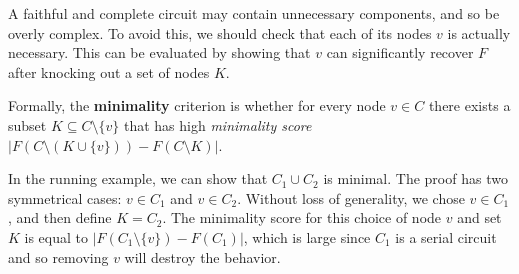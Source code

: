 A faithful and complete circuit may contain unnecessary components, and so be overly complex. %
To avoid this, we should check that each of its nodes $v$ is actually necessary. %
This can be evaluated by showing that $v$ can significantly recover $F$ after knocking out a set of nodes $K$. 

Formally, the \textbf{minimality} criterion is whether for every node $v\in C$ there exists a subset $K \subseteq C \setminus \{v\}$ that has high \emph{minimality score} $|F(C \setminus (K \cup \{ v \})) - F(C \setminus K)| $. %




In the running example, we can show that $C_1 \cup C_2$ is minimal. The proof has two symmetrical cases: $v \in C_1 $ and $v\in C_2$. Without loss of generality, we chose $v \in C_1$, and then define $K = C_2$. The minimality score for this choice of node $v$ and set $K$ is equal to $|F(C_1 \setminus \{ v\}) - F(C_1)|$, which is large since $C_1$ is a serial circuit and so removing $v$ will destroy the behavior.





 
